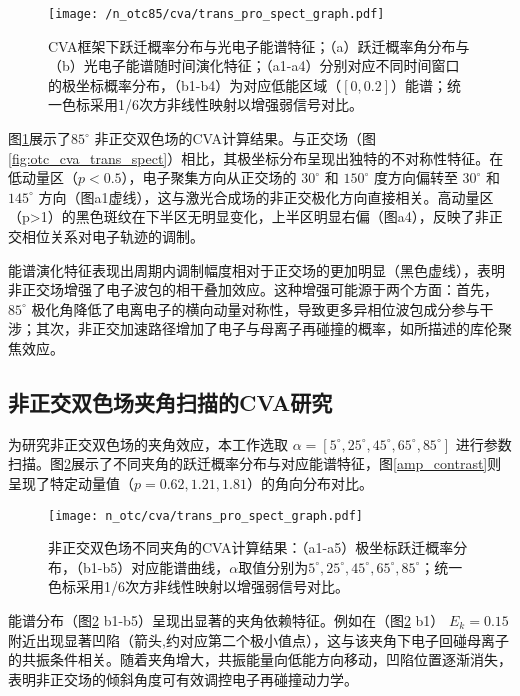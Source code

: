 \begin{figure}[!htbp]  %
	\centering
	\texttt{[image: /n\_otc85/cva/trans\_pro\_spect\_graph.pdf]}
	\caption{CVA框架下跃迁概率分布与光电子能谱特征；（a）跃迁概率角分布与（b）光电子能谱随时间演化特征；（a1-a4）分别对应不同时间窗口的极坐标概率分布，（b1-b4）为对应低能区域（$[0, 0.2]$）能谱；统一色标采用1/6次方非线性映射以增强弱信号对比。}
	\label{fig:n_otc85_cva_trans_spect}
\end{figure}

图\ref{fig:n_otc85_cva_trans_spect}展示了$85^\circ$ 非正交双色场的CVA计算结果。与正交场（图\ref{fig:otc_cva_trans_spect}）相比，其极坐标分布呈现出独特的不对称性特征。在低动量区（$p<0.5$），电子聚集方向从正交场的 $30^\circ$ 和 $150^\circ$ 度方向偏转至 $30^\circ$ 和 $145^\circ$ 方向（图a1虚线），这与激光合成场的非正交极化方向直接相关。高动量区（p>1）的黑色斑纹在下半区无明显变化，上半区明显右偏（图a4），反映了非正交相位关系对电子轨迹的调制。

能谱演化特征表现出周期内调制幅度相对于正交场的更加明显（黑色虚线），表明非正交场增强了电子波包的相干叠加效应。这种增强可能源于两个方面：首先，$85^\circ$ 极化角降低了电离电子的横向动量对称性，导致更多异相位波包成分参与干涉；其次，非正交加速路径增加了电子与母离子再碰撞的概率，如所描述的库伦聚焦效应。

\subsection{非正交双色场夹角扫描的CVA研究}

为研究非正交双色场的夹角效应，本工作选取 $\alpha = [5^\circ,25^\circ,45^\circ,65^\circ,85^\circ]$ 进行参数扫描。图\ref{fig:n_otc_cva_trans_spect}展示了不同夹角的跃迁概率分布与对应能谱特征，图\ref{amp_contrast}则呈现了特定动量值（$p=0.62,1.21,1.81$）的角向分布对比。

\begin{figure}[!htbp]
	\centering
	\texttt{[image: n\_otc/cva/trans\_pro\_spect\_graph.pdf]}
	\caption{非正交双色场不同夹角的CVA计算结果：（a1-a5）极坐标跃迁概率分布，（b1-b5）对应能谱曲线，$\alpha$取值分别为$5^\circ,25^\circ,45^\circ,65^\circ,85^\circ$；统一色标采用1/6次方非线性映射以增强弱信号对比。}
	\label{fig:n_otc_cva_trans_spect}
\end{figure}

能谱分布（图\ref{fig:n_otc_cva_trans_spect} b1-b5）呈现出显著的夹角依赖特征。例如在（图\ref{fig:n_otc_cva_trans_spect} b1） $E_k=0.15$ 附近出现显著凹陷（箭头,约对应第二个极小值点），这与该夹角下电子回碰母离子的共振条件相关。随着夹角增大，共振能量向低能方向移动，凹陷位置逐渐消失，表明非正交场的倾斜角度可有效调控电子再碰撞动力学。

